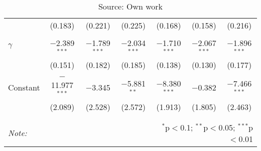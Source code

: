 \begin{table}[!htbp]
\begin{tabular}{@{\extracolsep{5pt}}lcccccc}
            & (0.183) & (0.221) & (0.225) & (0.168) & (0.158) & (0.216) \\ 
            & & & & & & \\ 
 $\gamma$   & $-$2.389$^{***}$ & $-$1.789$^{***}$ & $-$2.034$^{***}$ & $-$1.710$^{***}$ & $-$2.067$^{***}$ & $-$1.896$^{***}$ \\ 
            & (0.151) & (0.182) & (0.185) & (0.138) & (0.130) & (0.177) \\ 
            & & & & & & \\ 
 Constant   & $-$11.977$^{***}$ & $-$3.345 & $-$5.881$^{**}$ & $-$8.380$^{***}$ & $-$0.382 & $-$7.466$^{***}$ \\ 
            & (2.089) & (2.528) & (2.572) & (1.913) & (1.805) & (2.463) \\ 
            & & & & & & \\ 
\hline 
\hline \\[-1.8ex] 
\textit{Note:}  & & & & \multicolumn{3}{r}{$^{*}$p$<$0.1; $^{**}$p$<$0.05; $^{***}$p$<$0.01} \\ 
\bottomrule 
\end{tabular}
\caption*{Source: Own work} 
\end{table} 

